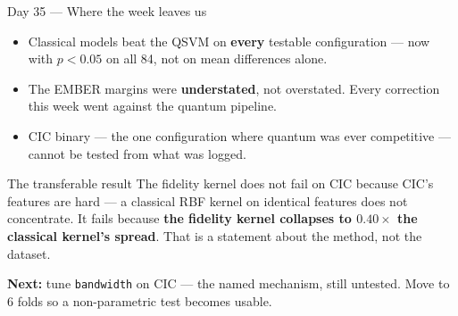 \documentclass[aspectratio=169,11pt]{beamer}
\newcommand{\daytag}[1]{{\color{blue!55!black}Day #1} --- }
\begin{document}
\begin{frame}{\daytag{35}Where the week leaves us}
\small
\begin{itemize}
  \item Classical models beat the QSVM on \textbf{every} testable configuration
        --- now with $p<0.05$ on all 84, not on mean differences alone.
  \item The EMBER margins were \textbf{understated}, not overstated. Every
        correction this week went against the quantum pipeline.
  \item CIC binary --- the one configuration where quantum was ever competitive
        --- cannot be tested from what was logged.
\end{itemize}

\vspace{0.4em}
\begin{block}{The transferable result}
The fidelity kernel does not fail on CIC because CIC's features are hard --- a
classical RBF kernel on identical features does not concentrate. It fails
because \textbf{the fidelity kernel collapses to $\mathbf{0.40\times}$ the
classical kernel's spread}. That is a statement about the method, not the
dataset.
\end{block}

\vspace{0.2em}
\textbf{Next:} tune \texttt{bandwidth} on CIC --- the named mechanism, still
untested. \quad Move to 6 folds so a non-parametric test becomes usable.
\end{frame}
\end{document}
